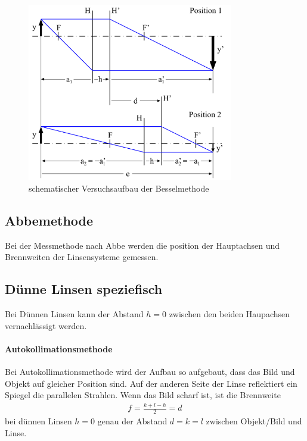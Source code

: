 \documentclass[11pt, a4paper]{article}
\begin{document}
    \begin{figure}
        \centering
        \includegraphics[width=0.8\textwidth]{Bessel_Abb.png}
        \caption{schematischer Versuchsaufbau der Besselmethode \cite{OPA}}   %
        \label{fig:BesselAbb}
    \end{figure}

    \subsection{Abbemethode}

    Bei der Messmethode nach Abbe werden die position der Hauptachsen und Brennweiten der Linsensysteme gemessen. 


    \subsection{Dünne Linsen speziefisch}
    Bei Dünnen Linsen kann der Abstand $h = 0$ zwischen den beiden Haupachsen vernachlässigt werden.
    
    \paragraph{Autokollimationsmethode}
    Bei Autokollimationsmethode wird der Aufbau so aufgebaut, dass das Bild und Objekt auf gleicher Position sind. Auf der anderen Seite der Linse reflektiert ein Spiegel die parallelen Strahlen. Wenn das Bild scharf ist, ist die Brennweite
    \begin{align}
        f = \frac{k + l - h}{2}  = d \label{eq:auto}
    \end{align}
    bei dünnen Linsen $h=0$ genau der Abstand $d = k = l$ zwischen Objekt/Bild und Linse.
\end{document}

